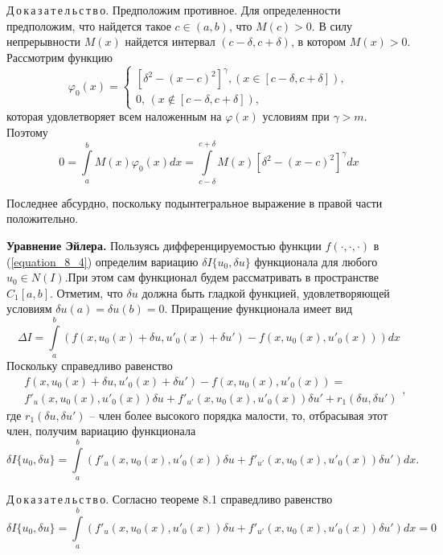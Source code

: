 Д\,о\,к\,а\,з\,а\,т\,е\,л\,ь\,с\,т\,в\,о. Предположим противное. Для определенности предположим, что найдется такое $c\in (a,b)$, что $M(c)>0$. В силу непрерывности $M(x)$ найдется интервал $(c - \delta , c + \delta )$, в котором $M(x)>0$. Рассмотрим функцию
$$\varphi_0(x)=
\begin{cases}
[\delta^2 - (x - c)^2]^\gamma ,(x \in [c - \delta , c + \delta ]),\\
0,\,(x \notin [c - \delta , c + \delta ]),
\end{cases} $$
которая удовлетворяет всем наложенным на $\varphi (x)$ условиям при $\gamma >m.$ Поэтому
$$\textstyle 0=\int\limits_a^b M(x) \varphi_0 (x) dx =\int\limits_{c - \delta }^{c + \delta } M(x)[\delta^2 - (x - c)^2]^\gamma dx$$

	\newpage
	\noindent
	Последнее абсурдно, поскольку подынтегральное выражение в правой части положительно.

{\bf Уравнение Эйлера.}	Пользуясь дифференцируемостью функции $f(\cdot,\cdot,\cdot)$ в (\ref{equation_8_4}) определим вариацию $\delta I\{u_0,\delta u\}$ функционала для любого $u_0\in N(I)$.При этом сам функционал будем рассматривать в пространстве $C_1[a, b]$. Отметим, что $\delta u$ должна быть гладкой функцией, удовлетворяющей условиям $\delta u(a)=\delta u(b)=0$. Приращение функционала имеет вид
$$\textstyle \Delta I=\int\limits_a^b (f(x,u_0(x)+\delta u,u'_0(x)+\delta u')-f(x,u_0(x),u'_0(x)))dx $$
Поскольку справедливо равенство
$$\begin{aligned}
&f(x,u_0(x)+\delta u,u'_0(x)+\delta u')-f(x,u_0(x),u'_0(x))=\\
&f'_u(x,u_0(x),u'_0(x))\delta u+f'_{u'}(x,u_0(x),u'_0(x))\delta u'+r_1(\delta u,\delta u')
\end{aligned},$$
где $r_1(\delta u,\delta u')$ – член более высокого порядка малости, то, отбрасывая этот член, получим вариацию функционала
$$\textstyle \delta I\{u_0,\delta u\}=\int\limits_a^b (f'_u(x,u_0(x),u'_0(x))\delta u+f'_{u'}(x,u_0(x),u'_0(x))\delta u')dx.$$


Д\,о\,к\,а\,з\,а\,т\,е\,л\,ь\,с\,т\,в\,о. Согласно теореме 8.1 справедливо равенство
$$\textstyle \delta I\{u_0,\delta u\}=\int\limits_a^b (f'_u(x,u_0(x),u'_0(x))\delta u+f'_{u'}(x,u_0(x),u'_0(x))\delta u')dx=0$$

